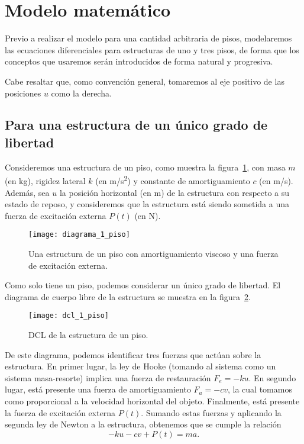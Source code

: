 \section{Modelo matemático}

Previo a realizar el modelo para una cantidad arbitraria de pisos, modelaremos las ecuaciones diferenciales para estructuras de uno y tres pisos, de forma que los conceptos que usaremos serán introducidos de forma natural y progresiva.

Cabe resaltar que, como convención general, tomaremos al eje positivo de las posiciones \(u\) como la derecha.

\subsection{Para una estructura de un único grado de libertad}

Consideremos una estructura de un piso, como muestra la figura~\ref{fig:1-floor-diagram}, con masa \(m\) (en \si{kg}), rigidez lateral \(k\) (en \si{m/s^2}) y constante de amortiguamiento \(c\) (en \si{m/s}). Además, sea \(u\) la posición horizontal (en \si{m}) de la estructura con respecto a su estado de reposo, y consideremos que la estructura está siendo sometida a una fuerza de excitación externa \(P(t)\) (en \si{N}).

\begin{figure}[h]
    \centering
    \texttt{[image: diagrama\_1\_piso]}
    \caption{Una estructura de un piso con amortiguamiento viscoso y una fuerza de excitación externa.}
    \label{fig:1-floor-diagram}
\end{figure}

Como solo tiene un piso, podemos considerar un único grado de libertad. El diagrama de cuerpo libre de la estructura se muestra en la figura~\ref{fig:1-floor-dcl}.

\begin{figure}[h]
    \centering
    \texttt{[image: dcl\_1\_piso]}
    \caption{DCL de la estructura de un piso.}
    \label{fig:1-floor-dcl}
\end{figure}

De este diagrama, podemos identificar tres fuerzas que actúan sobre la estructura. En primer lugar, la ley de Hooke (tomando al sistema como un sistema masa-resorte) implica una fuerza de restauración \(F_e = -ku\). En segundo lugar, está presente una fuerza de amortiguamiento \(F_a = -cv\), la cual tomamos como proporcional a la velocidad horizontal del objeto. Finalmente, está presente la fuerza de excitación externa \(P(t)\). Sumando estas fuerzas y aplicando la segunda ley de Newton a la estructura, obtenemos que se cumple la relación
\begin{equation}\label{eqn:almost}
    -ku - cv + P(t) = ma
.\end{equation}

